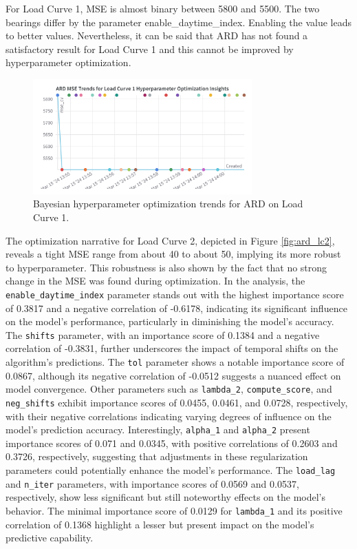 \documentclass{article} %
\begin{document}
For Load Curve 1, \gls*{MSE} is almost binary between 5800 and 5500. The two bearings differ by the parameter enable\_daytime\_index. Enabling the value leads to better values. Nevertheless, it can be said that ARD has not found a satisfactory result for Load Curve 1 and this cannot be improved by hyperparameter optimization.
\begin{figure}[H]
    \centering
    \includegraphics[width=0.75\textwidth]{ressources/Hyperparams/ard/ARD MSE Trends for Load Curve 1 Hyperparameter Optimization Insights.png}
    \caption{Bayesian hyperparameter optimization trends for ARD on Load Curve 1.}
    \label{fig:ard_lc1}
\end{figure}
The optimization narrative for Load Curve 2, depicted in Figure \ref{fig:ard_lc2}, reveals a tight \gls*{MSE} range from about 40 to about 50, implying its more robust to hyperparameter. This robustness is also shown by the fact that no strong change in the MSE was found during optimization.
In the analysis, the \texttt{enable\_daytime\_index} parameter stands out with the highest importance score of 0.3817 and a negative correlation of -0.6178, indicating its significant influence on the model's performance, particularly in diminishing the model's accuracy. The \texttt{shifts} parameter, with an importance score of 0.1384 and a negative correlation of -0.3831, further underscores the impact of temporal shifts on the algorithm's predictions. The \texttt{tol} parameter shows a notable importance score of 0.0867, although its negative correlation of -0.0512 suggests a nuanced effect on model convergence. Other parameters such as \texttt{lambda\_2}, \texttt{compute\_score}, and \texttt{neg\_shifts} exhibit importance scores of 0.0455, 0.0461, and 0.0728, respectively, with their negative correlations indicating varying degrees of influence on the model's prediction accuracy. Interestingly, \texttt{alpha\_1} and \texttt{alpha\_2} present importance scores of 0.071 and 0.0345, with positive correlations of 0.2603 and 0.3726, respectively, suggesting that adjustments in these regularization parameters could potentially enhance the model's performance. The \texttt{load\_lag} and \texttt{n\_iter} parameters, with importance scores of 0.0569 and 0.0537, respectively, show less significant but still noteworthy effects on the model's behavior. The minimal importance score of 0.0129 for \texttt{lambda\_1} and its positive correlation of 0.1368 highlight a lesser but present impact on the model's predictive capability.
\end{document}
